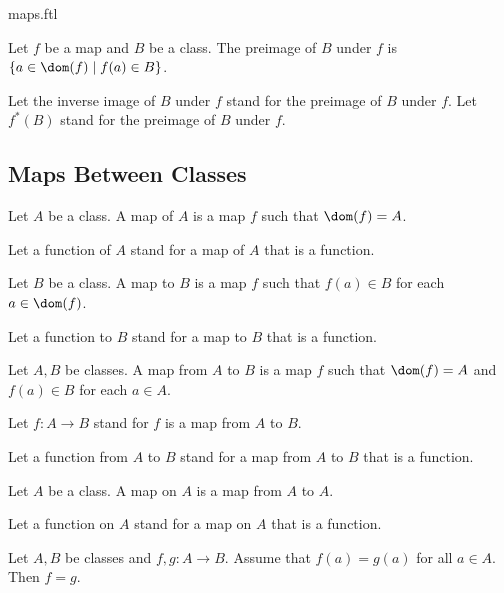 \documentclass{naproche-library}
\begin{document}
\begin{smodule}{maps.ftl}
  \begin{definition}[forthel,id=FOUNDATIONS_06_4563167805964288,printid]
    Let $f$ be a map and $B$ be a class.
    The preimage of $B$ under $f$ is $\{ a \in \dom(f) \mid f(a) \in B \}$.

    Let the inverse image of $B$ under $f$ stand for the preimage of $B$ under $f$.
    Let $f^{*}(B)$ stand for the preimage of $B$ under $f$.
  \end{definition}


  \subsection*{Maps Between Classes}

  \begin{definition}[forthel,id=FOUNDATIONS_06_6934038600220672,printid]
    Let $A$ be a class.
    A map of $A$ is a map $f$ such that $\dom(f) = A$.

    Let a function of $A$ stand for a map of $A$ that is a function.
  \end{definition}

  \begin{definition}[forthel,id=FOUNDATIONS_06_7725375157174272,printid]
    Let $B$ be a class.
    A map to $B$ is a map $f$ such that $f(a) \in B$ for each $a \in \dom(f)$.

    Let a function to $B$ stand for a map to $B$ that is a function.
  \end{definition}

  \begin{definition}[forthel,id=FOUNDATIONS_06_2823507398361088,printid]
    Let $A, B$ be classes.
    A map from $A$ to $B$ is a map $f$ such that $\dom(f) = A$ and $f(a) \in B$ for each $a \in A$.

    Let $f: A \to B$ stand for $f$ is a map from $A$ to $B$.

    Let a function from $A$ to $B$ stand for a map from $A$ to $B$ that is a function.
  \end{definition}

  \begin{definition}[forthel,id=FOUNDATIONS_06_3390734908522496,printid]
    Let $A$ be a class.
    A map on $A$ is a map from $A$ to $A$.

    Let a function on $A$ stand for a map on $A$ that is a function.
  \end{definition}

  \begin{proposition}[forthel,id=FOUNDATIONS_06_3312973569327104,printid]
    Let $A, B$ be classes and $f, g : A \to B$.
    Assume that $f(a) = g(a)$ for all $a \in A$.
    Then $f = g$.
  \end{proposition}


\end{smodule}
\end{document}
